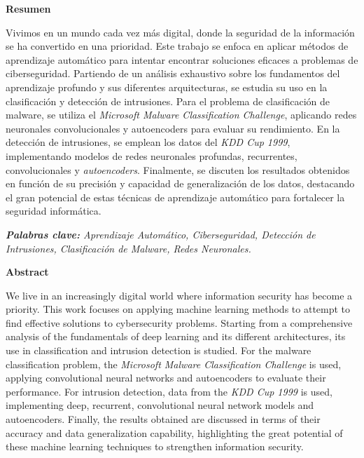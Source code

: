 \documentclass[11pt,a4paper]{book}
\begin{document}
\thispagestyle{empty}
\clearpage
\setcounter{page}{1}


\begin{center}
{\bf Resumen}
\end{center}
Vivimos en un mundo cada vez más digital, donde la seguridad de la información se ha convertido en una prioridad. Este trabajo se enfoca en aplicar métodos de aprendizaje automático para intentar encontrar soluciones eficaces a problemas de ciberseguridad. Partiendo de un análisis exhaustivo sobre los fundamentos del aprendizaje profundo y sus diferentes arquitecturas, se estudia su uso en la clasificación y detección de intrusiones. Para el problema de clasificación de malware, se utiliza el \textit{Microsoft Malware Classification Challenge}, aplicando redes neuronales convolucionales y autoencoders para evaluar su rendimiento. En la detección de intrusiones, se emplean los datos del \textit{KDD Cup 1999}, implementando modelos de redes neuronales profundas, recurrentes, convolucionales y \textit{autoencoders}. Finalmente, se discuten los resultados obtenidos en función de su precisión y capacidad de generalización de los datos, destacando el gran potencial de estas técnicas de aprendizaje automático para fortalecer la seguridad informática.



\vspace{0.6 cm}
\textsl{\textbf{Palabras clave:} Aprendizaje Automático, Ciberseguridad, Detección de Intrusiones, Clasificación de Malware, Redes Neuronales.}




\begin{center}
   {\bf Abstract} 
\end{center}
We live in an increasingly digital world where information security has become a priority. This work focuses on applying machine learning methods to attempt to find effective solutions to cybersecurity problems. Starting from a comprehensive analysis of the fundamentals of deep learning and its different architectures, its use in classification and intrusion detection is studied. For the malware classification problem, the \textit{Microsoft Malware Classification Challenge} is used, applying convolutional neural networks and autoencoders to evaluate their performance. For intrusion detection, data from the \textit{KDD Cup 1999} is used, implementing deep, recurrent, convolutional neural network models and autoencoders. Finally, the results obtained are discussed in terms of their accuracy and data generalization capability, highlighting the great potential of these machine learning techniques to strengthen information security.
\end{document}
